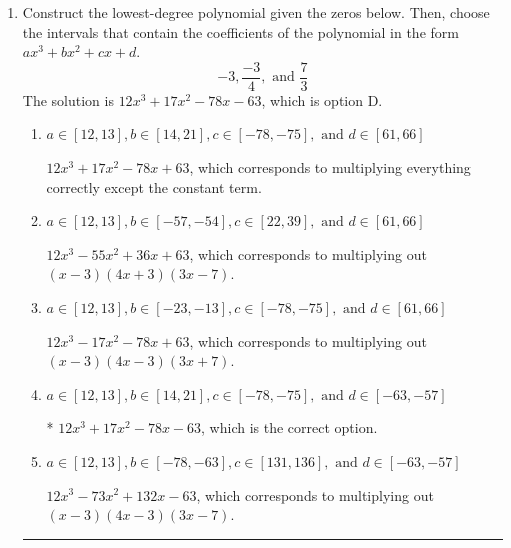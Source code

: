 \documentclass{extbook}[14pt]
\newcommand{\litem}[1]{\item #1

\rule{\textwidth}{0.4pt}}
\begin{document}
\begin{enumerate}\litem{
Construct the lowest-degree polynomial given the zeros below. Then, choose the intervals that contain the coefficients of the polynomial in the form $ax^3+bx^2+cx+d$.
\[ -3, \frac{-3}{4}, \text{ and } \frac{7}{3} \]The solution is \( 12x^{3} +17 x^{2} -78 x -63 \), which is option D.\begin{enumerate}[label=\Alph*.]
\item \( a \in [12, 13], b \in [14, 21], c \in [-78, -75], \text{ and } d \in [61, 66] \)

$12x^{3} +17 x^{2} -78 x + 63$, which corresponds to multiplying everything correctly except the constant term.
\item \( a \in [12, 13], b \in [-57, -54], c \in [22, 39], \text{ and } d \in [61, 66] \)

$12x^{3} -55 x^{2} +36 x + 63$, which corresponds to multiplying out $(x -3)(4x + 3)(3x -7)$.
\item \( a \in [12, 13], b \in [-23, -13], c \in [-78, -75], \text{ and } d \in [61, 66] \)

$12x^{3} -17 x^{2} -78 x + 63$, which corresponds to multiplying out $(x -3)(4x -3)(3x + 7)$.
\item \( a \in [12, 13], b \in [14, 21], c \in [-78, -75], \text{ and } d \in [-63, -57] \)

* $12x^{3} +17 x^{2} -78 x -63$, which is the correct option.
\item \( a \in [12, 13], b \in [-78, -63], c \in [131, 136], \text{ and } d \in [-63, -57] \)

$12x^{3} -73 x^{2} +132 x -63$, which corresponds to multiplying out $(x -3)(4x -3)(3x -7)$.
\end{enumerate}

}
\end{enumerate}
\end{document}
